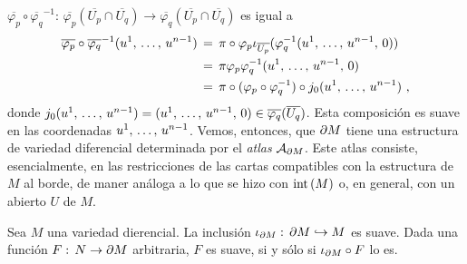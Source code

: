 $\overline{\varphi_{p}}\circ\overline{\varphi_{q}}^{-1}:\,%
\overline{\varphi_{p}}(\overline{U_{p}}\cap\overline{U_{q}})\rightarrow%
\overline{\varphi_{q}}(\overline{U_{p}}\cap\overline{U_{q}})$ es igual a
\begin{align*}
	\overline{\varphi_{p}}\circ\overline{\varphi_{q}}^{-1}
		(\lista*{u}{n-1}) & \,=\,
		\pi\circ\varphi_{p}\inc[\overline{U_{p}}](\varphi_{q}^{-1}(
			\lista*{u}{n-1},\,0)) \\
	& \,=\,\pi\varphi_{p}\varphi_{q}^{-1}(\lista*{u}{n-1},\,0) \\
	& \,=\,\pi\circ(\varphi_{p}\circ\varphi_{q}^{-1})\circ j_{0}
		(\lista*{u}{n-1})
	\text{ ,}
\end{align*}
%
donde $j_{0}(\lista*{u}{n-1})=(\lista*{u}{n-1},\,0)\in%
\overline{\varphi_{q}}(\overline{U_{q}})$. Esta composici\'{o}n es suave
en las coordenadas $\lista*{u}{n-1}$. Vemos, entonces, que $\borde[M]$ tiene
una estructura de variedad diferencial determinada por el \emph{atlas}
$\cal{A}_{\borde[M]}$. Este atlas consiste, esencialmente, en las
restricciones de las cartas compatibles con la estructura de $M$ al borde,
de maner an\'{a}loga a lo que se hizo con $\interior{M}$ o, en general,
con un abierto $U$ de $M$.

\begin{propoBordeEsSubvariedadRegular}\label{thm:bordesubvarreg}
	Sea $M$ una variedad dierencial. La inclusi\'{o}n
	$\inc[{\borde[M]}]:\,\borde[M]\hookrightarrow M$ es suave. Dada
	una funci\'{o}n $F:\,N\rightarrow\borde[M]$ arbitraria,
	$F$ es suave, si y s\'{o}lo si $\inc[{\borde[M]}]\circ F$ lo es.
\end{propoBordeEsSubvariedadRegular}

